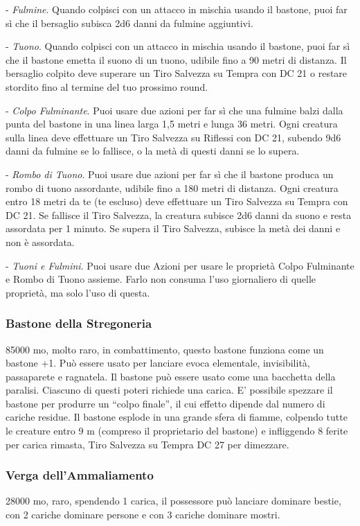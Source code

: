 \begin{multicols}{2}
	- \textit{Fulmine}. Quando colpisci con un attacco in mischia usando il bastone, puoi far sì che il bersaglio subisca 2d6 danni da fulmine aggiuntivi.

	- \textit{Tuono}. Quando colpisci con un attacco in mischia usando il bastone, puoi far sì che il bastone emetta il suono di un tuono, udibile fino a 90 metri di distanza. Il bersaglio colpito deve superare un Tiro Salvezza su Tempra con DC 21 o restare stordito fino al termine del tuo prossimo round.

	- \textit{Colpo Fulminante}. Puoi usare due azioni per far sì che una fulmine balzi dalla punta del bastone in una linea larga 1,5 metri e lunga 36 metri. Ogni creatura sulla linea deve effettuare un Tiro Salvezza su Riflessi con DC 21, subendo 9d6 danni da fulmine se lo fallisce, o la metà di questi danni se lo supera.

	- \textit{Rombo di Tuono}. Puoi usare due azioni per far sì che il bastone produca un rombo di tuono assordante, udibile fino a 180 metri di distanza. Ogni creatura entro 18 metri da te (te escluso) deve effettuare un Tiro Salvezza su Tempra con DC 21. Se fallisce il Tiro Salvezza, la creatura subisce 2d6 danni da suono e resta assordata per 1 minuto. Se supera il Tiro Salvezza, subisce la metà dei danni e non è assordata.

	- \textit{Tuoni e Fulmini}. Puoi usare due Azioni per usare le proprietà Colpo Fulminante e Rombo di Tuono assieme. Farlo non consuma l'uso giornaliero di quelle proprietà, ma solo l'uso di questa.

	\subsubsection*{Bastone della Stregoneria}
	85000 mo, molto raro, in combattimento, questo bastone funziona come un bastone +1. Può essere usato per lanciare evoca elementale, invisibilità, passaparete e ragnatela. Il bastone può essere usato come una bacchetta della paralisi. Ciascuno di questi poteri richiede una carica. E' possibile spezzare il bastone per produrre un “colpo finale”, il cui effetto dipende dal numero di cariche residue. Il bastone esplode in una grande sfera di fiamme, colpendo tutte le creature entro 9 m (compreso il proprietario del bastone) e infliggendo 8 ferite per carica rimasta, Tiro Salvezza su Tempra DC 27 per dimezzare.

	\subsubsection*{Verga dell'Ammaliamento}
	28000 mo, raro, spendendo 1 carica, il possessore può lanciare dominare bestie, con 2 cariche dominare persone e con 3 cariche dominare mostri.


\end{multicols}
